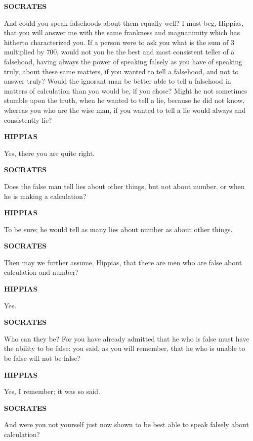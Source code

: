 \documentclass[11pt,letter]{article}
\begin{document}
\par \textbf{SOCRATES}
\par   And could you speak falsehoods about them equally well? I must beg, Hippias, that you will answer me with the same frankness and magnanimity which has hitherto characterized you. If a person were to ask you what is the sum of 3 multiplied by 700, would not you be the best and most consistent teller of a falsehood, having always the power of speaking falsely as you have of speaking truly, about these same matters, if you wanted to tell a falsehood, and not to answer truly? Would the ignorant man be better able to tell a falsehood in matters of calculation than you would be, if you chose? Might he not sometimes stumble upon the truth, when he wanted to tell a lie, because he did not know, whereas you who are the wise man, if you wanted to tell a lie would always and consistently lie?

\par \textbf{HIPPIAS}
\par   Yes, there you are quite right.

\par \textbf{SOCRATES}
\par   Does the false man tell lies about other things, but not about number, or when he is making a calculation?

\par \textbf{HIPPIAS}
\par   To be sure; he would tell as many lies about number as about other things.

\par \textbf{SOCRATES}
\par   Then may we further assume, Hippias, that there are men who are false about calculation and number?

\par \textbf{HIPPIAS}
\par   Yes.

\par \textbf{SOCRATES}
\par   Who can they be? For you have already admitted that he who is false must have the ability to be false:  you said, as you will remember, that he who is unable to be false will not be false?

\par \textbf{HIPPIAS}
\par   Yes, I remember; it was so said.

\par \textbf{SOCRATES}
\par   And were you not yourself just now shown to be best able to speak falsely about calculation?
\end{document}
